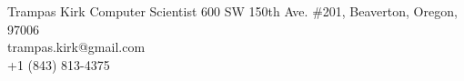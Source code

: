 \documentclass[9pt]{article}
\begin{document}
%
%
%
%

\setmainfont

\header
{\LARGE Trampas Kirk}
{\Large Computer Scientist}
{\hspace{5em}\small600 SW 150th Ave. \#201, Beaverton, Oregon, 97006\\
trampas.kirk@gmail.com\\
+1 (843) 813-4375}

%
%
%
%
%
%
%
%

\chomp
\end{document}
